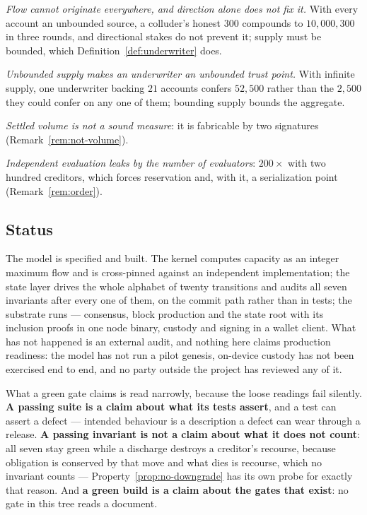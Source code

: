 \emph{Flow cannot originate everywhere, and direction alone does not fix it.} With every
account an unbounded source, a colluder's honest $300$ compounds to $10{,}000{,}300$ in
three rounds, and directional stakes do not prevent it; supply must be bounded, which
Definition~\ref{def:underwriter} does.

\emph{Unbounded supply makes an underwriter an unbounded trust point.} With infinite
supply, one underwriter backing $21$ accounts confers $52{,}500$ rather than the $2{,}500$
they could confer on any one of them; bounding supply bounds the aggregate.

\emph{Settled volume is not a sound measure}: it is fabricable by two signatures
(Remark~\ref{rem:not-volume}).

\emph{Independent evaluation leaks by the number of evaluators}: $200\times$ with two
hundred creditors, which forces reservation and, with it, a serialization point
(Remark~\ref{rem:order}).

\subsection{Status}

The model is specified and built. The kernel computes capacity as an integer maximum
flow and is cross-pinned against an independent implementation; the state layer drives
the whole alphabet of twenty transitions and audits all seven invariants after every one
of them, on the commit path rather than in tests; the substrate runs --- consensus, block
production and the state root with its inclusion proofs in one node binary, custody and
signing in a wallet client. What has not happened is an external audit, and nothing here
claims production readiness: the model has not run a pilot genesis, on-device custody has
not been exercised end to end, and no party outside the project has reviewed any of it.

What a green gate claims is read narrowly, because the loose readings fail silently.
\textbf{A passing suite is a claim about what its tests assert}, and a test can assert a
defect --- intended behaviour is a description a defect can wear through a release.
\textbf{A passing invariant is not a claim about what it does not count}: all seven stay
green while a discharge destroys a creditor's recourse, because obligation is conserved
by that move and what dies is recourse, which no invariant counts ---
Property~\ref{prop:no-downgrade} has its own probe for exactly that reason. And
\textbf{a green build is a claim about the gates that exist}: no gate in this tree reads
a document.

